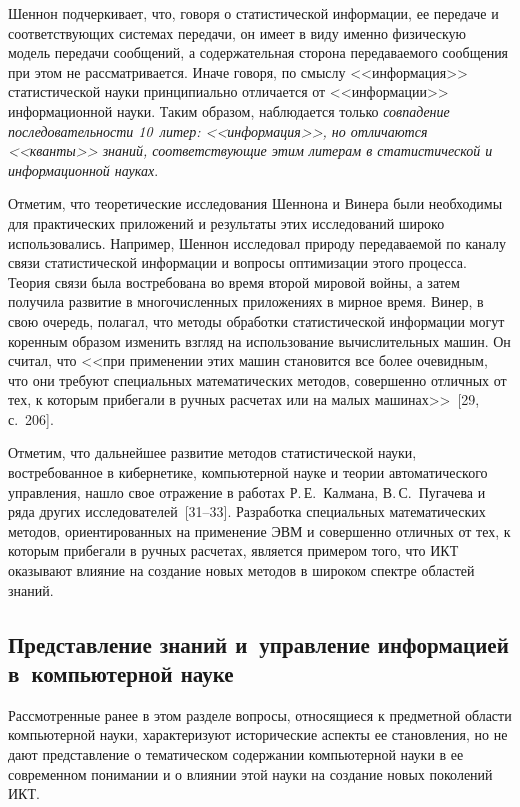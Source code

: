 \begin{multicols}{2}
      Шеннон подчеркивает, что, говоря о статистической информации, ее передаче и
соответ\-ст\-ву\-ющих системах передачи, он имеет в виду именно физическую модель передачи
сообщений, а содержательная сторона передаваемого сообщения при этом не рассматривается.
Иначе говоря, по смыс\-лу <<информация>> статистической науки принципиально отличается от
<<информации>> информационной науки. Таким образом, наблюдается только
\textit{совпадение последовательности 10~литер: <<информация>>, но отличаются
<<кванты>> знаний, соответствующие этим литерам в статистической и информационной
науках}.

      Отметим, что теоретические исследования Шеннона и Винера были необходимы для
практических приложений и результаты этих исследований широко использовались. Например,
Шеннон исследовал природу передаваемой по каналу связи статистической информации и
вопросы оптимизации этого процесса. Теория связи была востребована во время второй
мировой войны, а затем получила развитие в многочисленных приложениях в мирное время.
Винер, в свою очередь, полагал, что методы обработки статистической информации могут
коренным образом изменить взгляд на использование вычислительных машин. Он считал, что
<<при применении этих машин становится все более очевидным, что они требуют специальных
математических методов, совершенно отличных от тех, к которым прибегали в ручных расчетах
или на малых машинах>>~[29, с.~206].

      Отметим, что дальнейшее развитие методов статистической науки, востребованное в
кибернетике, компьютерной науке и теории автоматического управления, нашло свое
отражение в работах Р.\,Е.~Калмана, В.\,С.~Пугачева и ряда других
      исследователей~[31--33]. Разработка специальных
математических методов, ориентированных на применение ЭВМ и совершенно отличных от
тех, к которым прибегали в ручных расчетах, является примером того, что ИКТ оказывают
влияние на создание новых методов в широком спектре областей знаний.

\subsection{Представление знаний и~управление информацией
в~компьютерной науке} %

      Рассмотренные ранее в этом разделе вопросы, относящиеся к предметной области
компьютерной науки, характеризуют исторические аспекты ее становления, но не дают
представление о тематическом содержании компьютерной науки в ее современном понимании
и о влиянии этой науки на создание новых поколений ИКТ.


\end{multicols}
